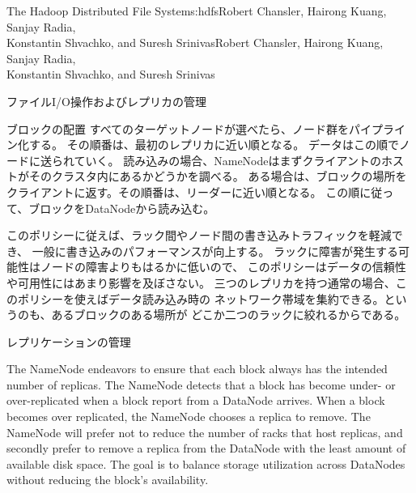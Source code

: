 \begin{aosachaptertoc}{The Hadoop Distributed File System}{s:hdfs}{Robert Chansler, Hairong Kuang, Sanjay Radia, \\ Konstantin Shvachko, and Suresh Srinivas}{Robert Chansler, Hairong Kuang, Sanjay Radia, \\ \hspace*{0.9cm} Konstantin Shvachko, and Suresh Srinivas}
\begin{aosasect1}{ファイルI/O操作およびレプリカの管理}
\begin{aosasect2}{ブロックの配置}
すべてのターゲットノードが選べたら、ノード群をパイプライン化する。
その順番は、最初のレプリカに近い順となる。
データはこの順でノードに送られていく。
読み込みの場合、NameNodeはまずクライアントのホストがそのクラスタ内にあるかどうかを調べる。
ある場合は、ブロックの場所をクライアントに返す。その順番は、リーダーに近い順となる。
この順に従って、ブロックをDataNodeから読み込む。

このポリシーに従えば、ラック間やノード間の書き込みトラフィックを軽減でき、
一般に書き込みのパフォーマンスが向上する。
ラックに障害が発生する可能性はノードの障害よりもはるかに低いので、
このポリシーはデータの信頼性や可用性にはあまり影響を及ぼさない。
三つのレプリカを持つ通常の場合、このポリシーを使えばデータ読み込み時の
ネットワーク帯域を集約できる。というのも、あるブロックのある場所が
どこか二つのラックに絞れるからである。

\end{aosasect2}

\begin{aosasect2}{レプリケーションの管理}

The NameNode endeavors to ensure that each block always has the
intended number of replicas. The NameNode detects that a block has
become under- or over-replicated when a block report from a DataNode
arrives. When a block becomes over replicated, the NameNode chooses a
replica to remove. The NameNode will prefer not to reduce the number
of racks that host replicas, and secondly prefer to remove a replica
from the DataNode with the least amount of available disk space. The
goal is to balance storage utilization across DataNodes without
reducing the block's availability.


\end{aosasect2}
\end{aosasect1}
\end{aosachaptertoc}
